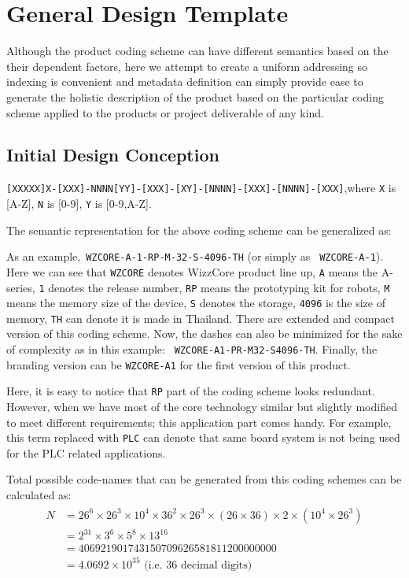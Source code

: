 \section{General Design Template}

Although the product coding scheme can have different semantics based on the their dependent factors, here we attempt to create a uniform addressing so indexing is convenient and metadata definition can simply provide ease to generate the holistic description of the product based on the particular coding scheme applied to the products or project deliverable of any kind.

\subsection{Initial Design Conception}

\texttt{[XXXXX]X-[XXX]-NNNN[YY]-[XXX]-[XY]-[NNNN]-[XXX]-[NNNN]-[XXX]},where \texttt{X} is [A-Z], \texttt{N} is [0-9], \texttt{Y} is [0-9,A-Z].

The semantic representation for the above coding scheme can be generalized as: 

As an example,\texttt{ WZCORE-A-1-RP-M-32-S-4096-TH} (or simply as \texttt{ WZCORE-A-1}). Here we can see that \texttt{WZCORE} denotes WizzCore product line up, \texttt{A} means the A-series, \texttt{1} denotes the release number, \texttt{RP} means the prototyping kit for robots, \texttt{M} means the memory size of the device, \texttt{S} denotes the storage, \texttt{4096} is the size of memory, \texttt{TH} can denote it is made in Thailand. There are extended and compact version of this coding scheme. Now, the dashes can also be minimized for the sake of complexity as in this example: \texttt{ WZCORE-A1-PR-M32-S4096-TH}. Finally, the branding version can be \texttt{WZCORE-A1} for the first version of this product.

Here, it is easy to notice that \texttt{RP} part of the coding scheme looks redundant. However, when we have most of the core technology similar but slightly modified to meet different requirements; this application part comes handy. For example, this term replaced with \texttt{PLC} can denote that same board system is not being used for the PLC related applications.

Total possible code-names that can be generated from this coding schemes can be calculated as:
\begin{align*}
    \begin{split}
       N &= 26^6 \times 26^3 \times 10^4 \times 36^2 \times 26^3 \times (26\times 36) \times 2\times(10^4 \times 26^3) \\
       &=  2^{31} \times 3^{6} \times 5^{8} \times 13^{16} \\
       &= 406921901743150709626581811200000000 \\
       &= 4.0692\times 10^{35} \text{ (i.e. 36 decimal digits)}
    \end{split}
\end{align*}

